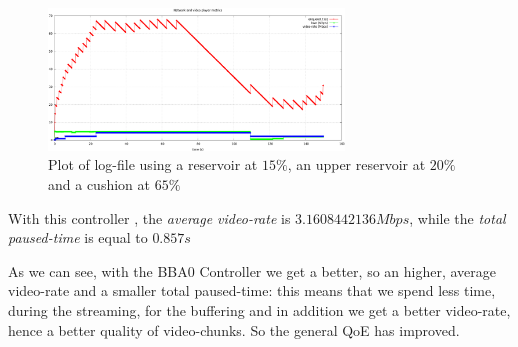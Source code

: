 \documentclass[a4paper]{report}
\begin{document}
\begin{figure}[H]
  \begin{center}
    \includegraphics[width=0.7\textwidth]{res_fifteen_cushion_sixtyfive}
  \end{center}
  \caption{Plot of log-file using a reservoir at $15\%$, an upper reservoir at $20\%$ and a cushion at $65\%$}\label{resfifteen}
\end{figure}

With this controller , the \textit{average video-rate} is $3.1608442136 Mbps$, while the \textit{total paused-time} is equal to $0.857 s$

As we can see, with the BBA0 Controller we get a better, so an higher, average video-rate  and a smaller total paused-time: this means that we spend less time, during the streaming, for the buffering and in addition we get a better video-rate, hence a better quality of video-chunks. So the general QoE has improved.



\end{document}
